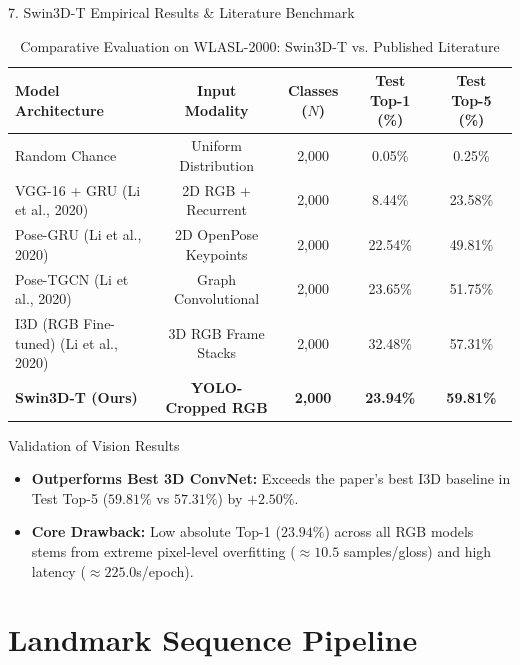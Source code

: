 \documentclass[aspectratio=169, 10pt]{beamer}
\begin{document}
\begin{frame}{7. Swin3D-T Empirical Results \& Literature Benchmark}
  \begin{table}
    \centering
    \caption{Comparative Evaluation on WLASL-2000: Swin3D-T vs. Published Literature}
    \scriptsize
    \begin{tabular}{lcccc}
      \toprule
      \textbf{Model Architecture} & \textbf{Input Modality} & \textbf{Classes ($N$)} & \textbf{Test Top-1 (\%)} & \textbf{Test Top-5 (\%)} \\
      \midrule
      Random Chance & Uniform Distribution & 2,000 & 0.05\% & 0.25\% \\
      VGG-16 + GRU (Li et al., 2020) & 2D RGB + Recurrent & 2,000 & 8.44\% & 23.58\% \\
      Pose-GRU (Li et al., 2020) & 2D OpenPose Keypoints & 2,000 & 22.54\% & 49.81\% \\
      Pose-TGCN (Li et al., 2020) & Graph Convolutional & 2,000 & 23.65\% & 51.75\% \\
      I3D (RGB Fine-tuned) (Li et al., 2020) & 3D RGB Frame Stacks & 2,000 & 32.48\% & 57.31\% \\
      \midrule
      \textbf{Swin3D-T (Ours)} & \textbf{YOLO-Cropped RGB} & \textbf{2,000} & \textbf{23.94\%} & \textbf{59.81\%} \\
      \bottomrule
    \end{tabular}
  \end{table}

  \begin{block}{Validation of Vision Results}
    \begin{itemize}
      \item \textbf{Outperforms Best 3D ConvNet:} Exceeds the paper's best I3D baseline in Test Top-5 ($59.81\%$ vs $57.31\%$) by $+2.50\%$.
      \item \textbf{Core Drawback:} Low absolute Top-1 ($23.94\%$) across all RGB models stems from extreme pixel-level overfitting ($\approx 10.5$ samples/gloss) and high latency ($\approx 225.0$s/epoch).
    \end{itemize}
  \end{block}
\end{frame}

\section{Landmark Sequence Pipeline}
\end{document}
